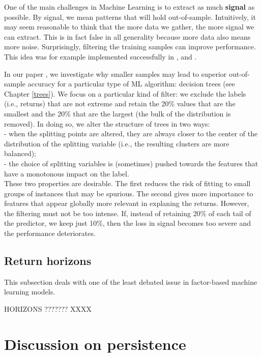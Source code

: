 \documentclass[]{krantz}
\theoremstyle{definition}
\theoremstyle{definition}
\theoremstyle{definition}
\theoremstyle{remark}
\begin{document}
One of the main challenges in Machine Learning is to extract as much
\textbf{signal} as possible. By signal, we mean patterns that will hold
out-of-sample. Intuitively, it may seem reasonable to think that the
more data we gather, the more signal we can extract. This is in fact
false in all generality because more data also means more noise.
Surprisingly, filtering the training samples can improve performance.
This idea was for example implemented successfully in
\citet{fu2018machine}, \citet{guida2019big} and
\citet{guida2018machine}.

In our paper \citet{coqueret2019training}, we investigate why smaller
samples may lead to superior out-of-sample accuracy for a particular
type of ML algorithm: decision trees (see Chapter \ref{trees}). We focus
on a particular kind of filter: we exclude the labels (i.e., returns)
that are not extreme and retain the 20\% values that are the smallest
and the 20\% that are the largest (the bulk of the distribution is
removed). In doing so, we alter the structure of trees in two ways:\\
- when the splitting points are altered, they are always closer to the
center of the distribution of the splitting variable (i.e., the
resulting clusters are more balanced);\\
- the choice of splitting variables is (sometimes) pushed towards the
features that have a monotonous impact on the label.\\
These two properties are desirable. The first reduces the risk of
fitting to small groups of instances that may be spurious. The second
gives more importance to features that appear globally more relevant in
explaning the returns. However, the filtering must not be too intense.
If, instead of retaining 20\% of each tail of the predictor, we keep
just 10\%, then the loss in signal becomes too severe and the
performance deteriorates.

\hypertarget{horizons}{%
\subsection{Return horizons}\label{horizons}}

This subsection deals with one of the least debated issue in
factor-based machine learning models.

\citet{jegadeesh1993returns} HORIZONS ??????? XXXX

\hypertarget{pers}{%
\section{Discussion on persistence}\label{pers}}
\end{document}
